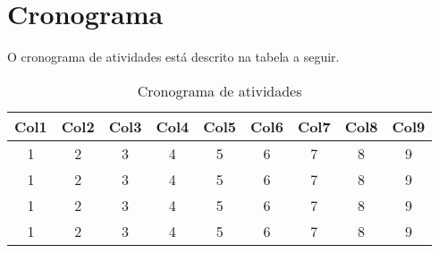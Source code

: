 \chapter{Cronograma}
\label{cap:cronograma}

O cronograma de atividades está descrito na tabela a seguir.

\begin{table}[h!]
    \centering
    \begin{tabular}{|c c c c c c c c c|}
     \hline
     Col1 & Col2 & Col3 & Col4 & Col5 & Col6 & Col7 & Col8 & Col9 \\
     \hline\hline
     1 & 2 & 3 & 4 & 5 & 6 & 7 & 8 & 9 \\
     1 & 2 & 3 & 4 & 5 & 6 & 7 & 8 & 9 \\
     1 & 2 & 3 & 4 & 5 & 6 & 7 & 8 & 9 \\
     1 & 2 & 3 & 4 & 5 & 6 & 7 & 8 & 9 \\
     \hline
    \end{tabular}
    \caption{Cronograma de atividades}
    \label{cronograma-atividades}
\end{table}
